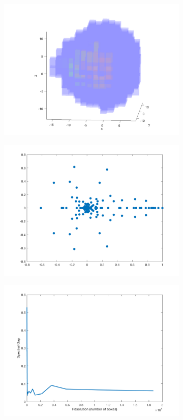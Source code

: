 \begin{figure}[H]
	\centering
	\begin{subfigure}[b]{0.3\textwidth}
		\includegraphics[width=\textwidth]{l84.png}
	\end{subfigure}
	\begin{subfigure}[b]{0.3\textwidth}
		\includegraphics[width=\textwidth]{spectralgapl84.png}
	\end{subfigure}
	\begin{subfigure}[b]{0.3\textwidth}
		\includegraphics[width=\textwidth]{spectruml84.png}

\end{subfigure}
\end{figure}

